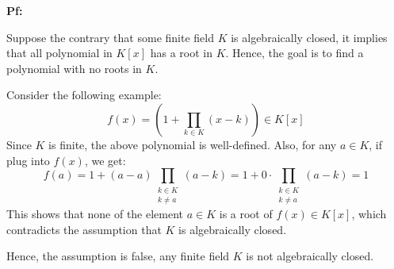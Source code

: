 \documentclass{article}
\begin{document}
\textbf{Pf:}

Suppose the contrary that some finite field $K$ is algebraically closed, it implies that all polynomial in $K[x]$ has a root in $K$. Hence, the goal is to find a polynomial with no roots in $K$.

Consider the following example:
$$f(x)=\left(1+\prod_{k\in K}(x-k)\right)\in K[x]$$
Since $K$ is finite, the above polynomial is well-defined. Also, for any $a\in K$, if plug into $f(x)$, we get:
$$f(a)=1+(a-a)\prod_{\substack{k\in K\\k\neq a}}(a-k) = 1+0\cdot \prod_{\substack{k\in K\\k\neq a}}(a-k) = 1$$
This shows that none of the element $a\in K$ is a root of $f(x)\in K[x]$, which contradicts the assumption that $K$ is algebraically closed.

Hence, the assumption is false, any finite field $K$ is not algebraically closed.
\end{document}
